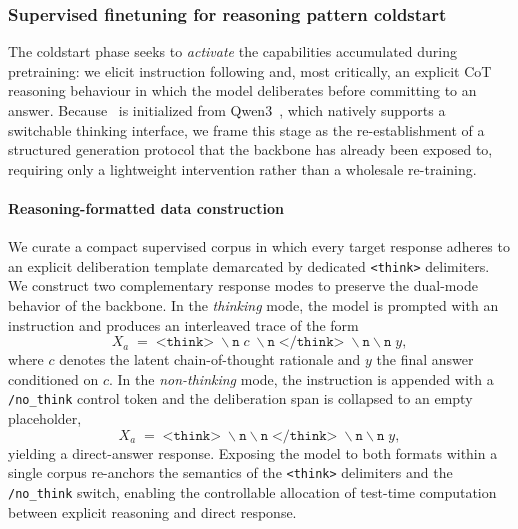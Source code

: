 \subsubsection{Supervised finetuning for reasoning pattern coldstart}
 

 
 
 
 
 
 
 
 
 

 
 
 
 
 

The coldstart phase seeks to \emph{activate} the capabilities accumulated during pretraining: we elicit instruction following and, most critically, an explicit CoT reasoning behaviour in which the model deliberates before committing to an answer. Because \projName~is initialized from Qwen3~\citep{yang2025qwen3}, which natively supports a switchable thinking interface, we frame this stage as the re-establishment of a structured generation protocol that the backbone has already been exposed to, requiring only a lightweight intervention rather than a wholesale re-training.

\paragraph{Reasoning-formatted data construction} We curate a compact supervised corpus in which every target response adheres to an explicit deliberation template demarcated by dedicated \texttt{<think>} delimiters. We construct two complementary response modes to preserve the dual-mode behavior of the backbone. In the \emph{thinking} mode, the model is prompted with an instruction and produces an interleaved trace of the form
\begin{equation}
    X_a \;=\; \texttt{<think>}\;\backslash\texttt{n}\; c \;\backslash\texttt{n}\; \texttt{</think>}\;\backslash\texttt{n}\backslash\texttt{n}\; y,
\end{equation}
where $c$ denotes the latent chain-of-thought rationale and $y$ the final answer conditioned on $c$. In the \emph{non-thinking} mode, the instruction is appended with a \texttt{/no\_think} control token and the deliberation span is collapsed to an empty placeholder,
\begin{equation}
    X_a \;=\; \texttt{<think>}\;\backslash\texttt{n}\backslash\texttt{n}\;\texttt{</think>}\;\backslash\texttt{n}\backslash\texttt{n}\; y,
\end{equation}
yielding a direct-answer response. Exposing the model to both formats within a single corpus re-anchors the semantics of the \texttt{<think>} delimiters and the \texttt{/no\_think} switch, enabling the controllable allocation of test-time computation between explicit reasoning and direct response.

